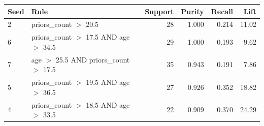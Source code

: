 \begin{tabular}{llrrrr}
\hline
Seed & Rule & Support & Purity & Recall & Lift \\
\hline
2 & priors\_count $>$ 20.5 & 28 & 1.000 & 0.214 & 11.02 \\
6 & priors\_count $>$ 17.5 AND age $>$ 34.5 & 29 & 1.000 & 0.193 & 9.62 \\
7 & age $>$ 25.5 AND priors\_count $>$ 17.5 & 35 & 0.943 & 0.191 & 7.86 \\
5 & priors\_count $>$ 19.5 AND age $>$ 36.5 & 27 & 0.926 & 0.352 & 18.82 \\
4 & priors\_count $>$ 18.5 AND age $>$ 33.5 & 22 & 0.909 & 0.370 & 24.29 \\
\hline
\end{tabular}